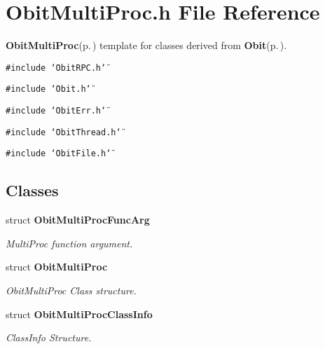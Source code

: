 \section{Obit\-Multi\-Proc.h File Reference}
\label{ObitMultiProc_8h}
{\bf Obit\-Multi\-Proc}{\rm (p.\,\pageref{structObitMultiProc})} template for classes derived from {\bf Obit}{\rm (p.\,\pageref{structObit})}. 

{\tt \#include \char`\"{}Obit\-RPC.h\char`\"{}}\par
{\tt \#include \char`\"{}Obit.h\char`\"{}}\par
{\tt \#include \char`\"{}Obit\-Err.h\char`\"{}}\par
{\tt \#include \char`\"{}Obit\-Thread.h\char`\"{}}\par
{\tt \#include \char`\"{}Obit\-File.h\char`\"{}}\par
\subsection*{Classes}
\begin{CompactItemize}
\item 
struct {\bf Obit\-Multi\-Proc\-Func\-Arg}
\begin{CompactList}\small\item\em Multi\-Proc function argument. \item\end{CompactList}\item 
struct {\bf Obit\-Multi\-Proc}
\begin{CompactList}\small\item\em Obit\-Multi\-Proc Class structure. \item\end{CompactList}\item 
struct {\bf Obit\-Multi\-Proc\-Class\-Info}
\begin{CompactList}\small\item\em Class\-Info Structure. \item\end{CompactList}\end{CompactItemize}
